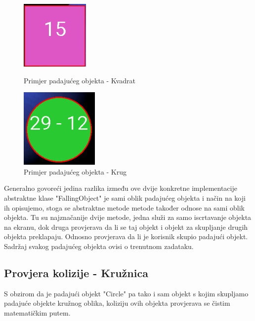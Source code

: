 \documentclass[times, utf8, zavrsni]{fer}
\begin{document}
	
		\begin{figure}[!htb]
			\begin{minipage}{0.48\textwidth}
				\centering
				\includegraphics[scale=0.6]{"slike/square.png"} 
				\caption{Primjer padajućeg objekta - Kvadrat}
				\label{fig:squre}
			\end{minipage}\hfill
			\begin{minipage}{0.48\textwidth}
				\centering
				\includegraphics[scale=0.6]{"slike/circle.png"} 
				\caption{Primjer padajućeg objekta - Krug}
				\label{fig:circle}
			\end{minipage}
		\end{figure}
		
		Generalno govoreći jedina razlika između ove dvije konkretne implementacije abstraktne klase "FallingObject" je sami oblik padajućeg objekta i način na koji ih opisujemo, stoga se abstraktne metode metode također odnose na sami oblik objekta.
		Tu su najznačanije dvije metode, jedna služi za samo iscrtavanje objekta na ekranu, dok druga provjerava da li se taj objekt i objekt za skupljanje drugih objekta preklapaju. Odnosno provjerava da li je korisnik skupio padajući objekt.
		Sadržaj svakog padajućeg objekta ovisi o trenutnom zadataku. 
		
	\subsection{Provjera kolizije - Kružnica}
	S obzirom da je padajući objekt "Circle" pa tako i sam objekt s kojim skupljamo padajuće objekte kružnog oblika, koliziju ovih objekta provjerava se čistim matematičkim putem. 
	
\end{document}
